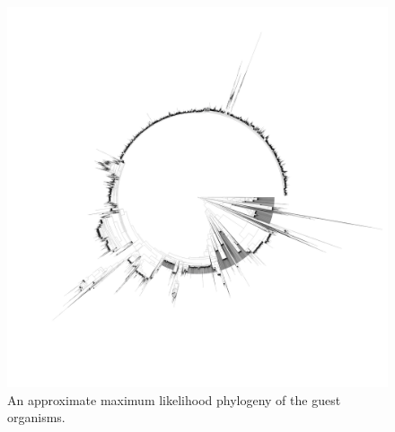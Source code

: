 \begin{figure}
    \includegraphics[width=\textwidth]{figures/fishpoo_tree.png}
    \caption{An approximate maximum likelihood phylogeny of the guest organisms.}
    \label{FP_guest_tree}
\end{figure}
